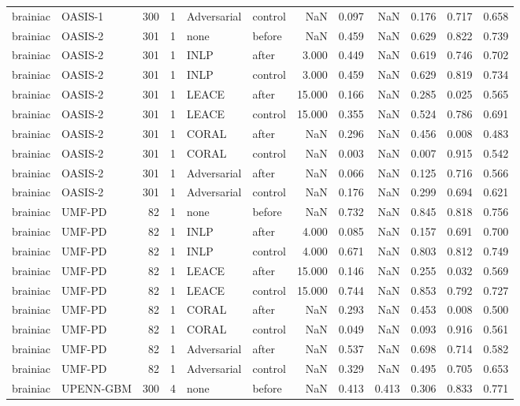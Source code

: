 \begin{tabular}{llrrllrrrrrr}
brainiac & OASIS-1 & 300 & 1 & Adversarial & control & NaN & 0.097 & NaN & 0.176 & 0.717 & 0.658 \\
brainiac & OASIS-2 & 301 & 1 & none & before & NaN & 0.459 & NaN & 0.629 & 0.822 & 0.739 \\
brainiac & OASIS-2 & 301 & 1 & INLP & after & 3.000 & 0.449 & NaN & 0.619 & 0.746 & 0.702 \\
brainiac & OASIS-2 & 301 & 1 & INLP & control & 3.000 & 0.459 & NaN & 0.629 & 0.819 & 0.734 \\
brainiac & OASIS-2 & 301 & 1 & LEACE & after & 15.000 & 0.166 & NaN & 0.285 & 0.025 & 0.565 \\
brainiac & OASIS-2 & 301 & 1 & LEACE & control & 15.000 & 0.355 & NaN & 0.524 & 0.786 & 0.691 \\
brainiac & OASIS-2 & 301 & 1 & CORAL & after & NaN & 0.296 & NaN & 0.456 & 0.008 & 0.483 \\
brainiac & OASIS-2 & 301 & 1 & CORAL & control & NaN & 0.003 & NaN & 0.007 & 0.915 & 0.542 \\
brainiac & OASIS-2 & 301 & 1 & Adversarial & after & NaN & 0.066 & NaN & 0.125 & 0.716 & 0.566 \\
brainiac & OASIS-2 & 301 & 1 & Adversarial & control & NaN & 0.176 & NaN & 0.299 & 0.694 & 0.621 \\
brainiac & UMF-PD & 82 & 1 & none & before & NaN & 0.732 & NaN & 0.845 & 0.818 & 0.756 \\
brainiac & UMF-PD & 82 & 1 & INLP & after & 4.000 & 0.085 & NaN & 0.157 & 0.691 & 0.700 \\
brainiac & UMF-PD & 82 & 1 & INLP & control & 4.000 & 0.671 & NaN & 0.803 & 0.812 & 0.749 \\
brainiac & UMF-PD & 82 & 1 & LEACE & after & 15.000 & 0.146 & NaN & 0.255 & 0.032 & 0.569 \\
brainiac & UMF-PD & 82 & 1 & LEACE & control & 15.000 & 0.744 & NaN & 0.853 & 0.792 & 0.727 \\
brainiac & UMF-PD & 82 & 1 & CORAL & after & NaN & 0.293 & NaN & 0.453 & 0.008 & 0.500 \\
brainiac & UMF-PD & 82 & 1 & CORAL & control & NaN & 0.049 & NaN & 0.093 & 0.916 & 0.561 \\
brainiac & UMF-PD & 82 & 1 & Adversarial & after & NaN & 0.537 & NaN & 0.698 & 0.714 & 0.582 \\
brainiac & UMF-PD & 82 & 1 & Adversarial & control & NaN & 0.329 & NaN & 0.495 & 0.705 & 0.653 \\
brainiac & UPENN-GBM & 300 & 4 & none & before & NaN & 0.413 & 0.413 & 0.306 & 0.833 & 0.771 \\

\end{tabular}
